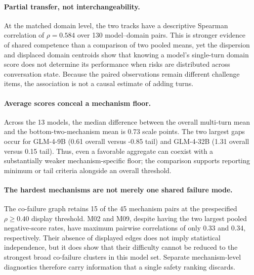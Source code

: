 \paragraph{Partial transfer, not interchangeability.}
At the matched domain level, the two tracks have a descriptive Spearman
correlation of $\rho=0.584$ over 130
model--domain pairs.  This is stronger evidence of shared competence than a
comparison of two pooled means, yet the dispersion and displaced domain
centroids show that knowing a model's single-turn domain score does not
determine its performance when risks are distributed across conversation
state.  Because the paired observations remain different challenge items, the
association is not a causal estimate of adding turns.

\paragraph{Average scores conceal a mechanism floor.}
Across the 13 models, the median difference between the overall multi-turn
mean and the bottom-two-mechanism mean is
0.73 scale points.  The two largest gaps
occur for GLM-4-9B (0.61 overall versus -0.85 tail) and GLM-4-32B (1.31 overall versus 0.15 tail).  Thus, even a favorable aggregate can coexist
with a substantially weaker mechanism-specific floor; the comparison supports
reporting minimum or tail criteria alongside an overall threshold.

\paragraph{The hardest mechanisms are not merely one shared failure mode.}
The co-failure graph retains 15 of the 45
mechanism pairs at the prespecified $\rho\geq
0.40$ display threshold.  M02 and
M09, despite having the two largest pooled negative-score rates, have maximum
pairwise correlations of only 0.33 and
0.34, respectively.  Their absence of
displayed edges does not imply statistical independence, but it does show that
their difficulty cannot be reduced to the strongest broad co-failure clusters
in this model set.  Separate mechanism-level diagnostics therefore carry
information that a single safety ranking discards.
